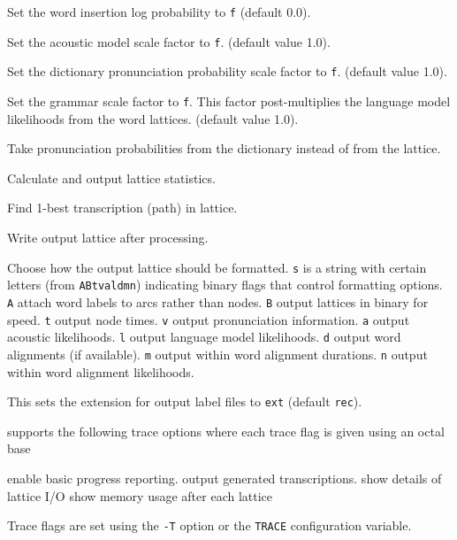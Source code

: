 \begin{optlist}
   Set the word insertion log probability to \texttt{f} 
  (default 0.0).
  
   Set the acoustic model scale factor to \texttt{f}.
  (default value 1.0).

   Set the dictionary pronunciation probability scale 
        factor to \texttt{f}. (default value 1.0).

   Set the grammar scale factor to \texttt{f}.
        This factor post-multiplies the language model likelihoods
        from the word lattices.  (default value 1.0).

   Take pronunciation probabilities from the dictionary
  instead of from the lattice.

   Calculate and output lattice statistics.

   Find 1-best transcription (path) in lattice.

   Write output lattice after processing.

   Choose how the output lattice should be formatted.
         \texttt{s} is a string with certain letters (from \texttt{ABtvaldmn})
         indicating binary flags that control formatting options.
         \texttt{A} attach word labels to arcs rather than nodes.
         \texttt{B} output lattices in binary for speed.
         \texttt{t} output node times.
         \texttt{v} output pronunciation information.
         \texttt{a} output acoustic likelihoods.
         \texttt{l} output language model likelihoods.
         \texttt{d} output word alignments (if available).
         \texttt{m} output within word alignment durations.
         \texttt{n} output within word alignment likelihoods.

    This sets the extension for output label files to
        \texttt{ext} (default \texttt{rec}).

\stdoptF
\stdoptG
\stdoptH
\stdoptI
\stdoptJ
\stdoptK
\stdoptP

\end{optlist}


 supports the following trace options where each
trace flag is given using an octal base
\begin{optlist}
    enable basic progress reporting.  
    output generated transcriptions.
    show details of lattice I/O
    show memory usage after each lattice
\end{optlist}
Trace flags are set using the \texttt{-T} option or the \texttt{TRACE} 
configuration variable.


